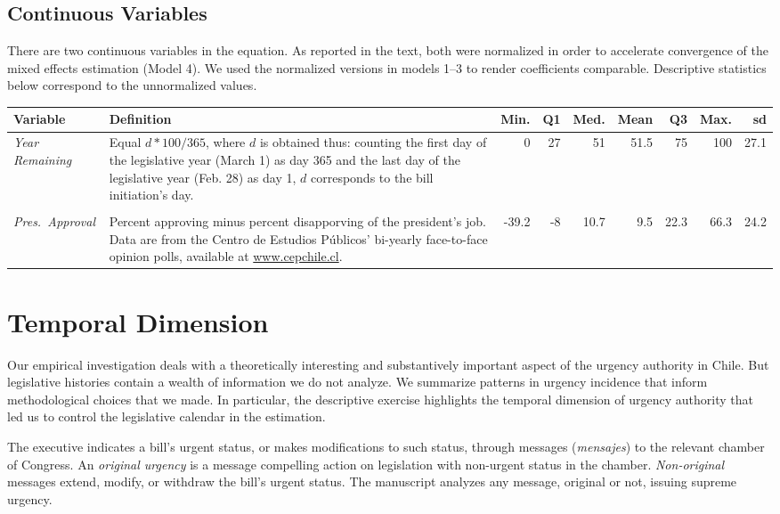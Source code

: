 \documentclass[letter,12pt]{article}
\begin{document}
\subsection{Continuous Variables}

There are two continuous variables in the equation. As reported in the text, both were normalized in order to accelerate convergence of the mixed effects estimation (Model 4). We used the normalized versions in models 1--3 to render coefficients comparable. Descriptive statistics below correspond to the unnormalized values.

\begin{footnotesize}
\singlespacing
\begin{tabularx}{\textwidth}{lXrrrrrrr} %
          Variable  & Definition &  Min.&  Q1 & Med. & Mean &  Q3  &  Max. &   sd \\ [.5ex] \hline
\emph{Year Remaining}& Equal $d*100/365$, where $d$ is obtained thus: counting the first day of the legislative year (March 1) as day 365 and the last day of the legislative year (Feb. 28) as day 1, $d$ corresponds to the bill initiation's day.     &  0   &  27 & 51   & 51.5 & 75   & 100   &   27.1 \\ [.5ex]
\\ [-1ex]
\emph{Pres.~Approval}& Percent approving minus percent disapporving of the president's job. Data are from the Centro de Estudios P\'ublicos' bi-yearly face-to-face opinion polls, available at \url{www.cepchile.cl}. &-39.2 & -8 &  10.7 &  9.5 & 22.3 &  66.3 &   24.2 \\ \hline
\end{tabularx}
\doublespacing
\end{footnotesize}
  
  \section{Temporal Dimension}\label{s:temp-dim}

Our empirical investigation deals with a theoretically interesting and substantively important aspect of the urgency authority in Chile. But legislative histories contain a wealth of information we do not analyze. We summarize patterns in urgency incidence that inform methodological choices that we made. In particular, the descriptive exercise highlights the temporal dimension of urgency authority that led us to control the legislative calendar in the estimation. 

The executive indicates a bill's urgent status, or makes modifications to such status, through messages (\emph{mensajes}) to the relevant chamber of Congress. An \emph{original urgency} is a message compelling action on legislation with non-urgent status in the chamber. \emph{Non-original} messages extend, modify, or withdraw the bill's urgent status. The manuscript analyzes any message, original or not, issuing supreme urgency.
\end{document}
